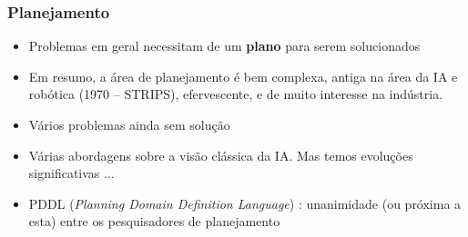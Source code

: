 \begin{frame}[fragile]

    \frametitle{Planejamento}

   \begin{block}{}
     \begin{itemize}
 

      
      

 
       
      \item Problemas em geral necessitam de um \textbf{plano} para serem solucionados

      \item Em resumo, a área de planejamento é bem complexa,  antiga na área da IA e robótica (1970 -- STRIPS), 
      efervescente, e de muito interesse na indústria.
      
      
      \pause
      
      \item Vários problemas ainda sem solução 
      
      \pause
      
      \item Várias abordagens sobre a visão clássica da IA. Mas temos evoluções
      significativas ...
      
      \pause
      \item PDDL (\textit{Planning Domain Definition Language}) : unanimidade (ou próxima a esta)
      entre os pesquisadores de planejamento
      

    \end{itemize}
    
    \end{block}
    
\end{frame}



